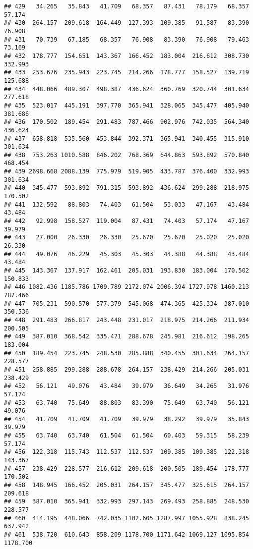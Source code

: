 \documentclass[
]{article}
\begin{document}
\begin{verbatim}
## 429   34.265   35.843   41.709   68.357   87.431   78.179   68.357   57.174
## 430  264.157  209.618  164.449  127.393  109.385   91.587   83.390   76.908
## 431   70.739   67.185   68.357   76.908   83.390   76.908   79.463   73.169
## 432  178.777  154.651  143.367  166.452  183.004  216.612  308.730  332.993
## 433  253.676  235.943  223.745  214.266  178.777  158.527  139.719  125.688
## 434  448.066  489.307  498.387  436.624  360.769  320.744  301.634  277.618
## 435  523.017  445.191  397.770  365.941  328.065  345.477  405.940  381.686
## 436  170.502  189.454  291.483  787.466  902.976  742.035  564.340  436.624
## 437  658.818  535.560  453.844  392.371  365.941  340.455  315.910  301.634
## 438  753.263 1010.588  846.202  768.369  644.863  593.892  570.840  468.454
## 439 2698.668 2088.139  775.979  519.905  433.787  376.400  332.993  301.634
## 440  345.477  593.892  791.315  593.892  436.624  299.288  218.975  170.502
## 441  132.592   88.803   74.403   61.504   53.033   47.167   43.484   43.484
## 442   92.998  158.527  119.004   87.431   74.403   57.174   47.167   39.979
## 443   27.000   26.330   26.330   25.670   25.670   25.020   25.020   26.330
## 444   49.076   46.229   45.303   45.303   44.388   44.388   43.484   43.484
## 445  143.367  137.917  162.461  205.031  193.830  183.004  170.502  150.833
## 446 1082.436 1185.786 1709.789 2172.074 2006.394 1727.978 1460.213  787.466
## 447  705.231  590.570  577.379  545.068  474.365  425.334  387.010  350.536
## 448  291.483  266.817  243.448  231.017  218.975  214.266  211.934  200.505
## 449  387.010  368.542  335.471  288.678  245.981  216.612  198.265  183.004
## 450  189.454  223.745  248.530  285.888  340.455  301.634  264.157  228.577
## 451  258.885  299.288  288.678  264.157  238.429  214.266  205.031  238.429
## 452   56.121   49.076   43.484   39.979   36.649   34.265   31.976   57.174
## 453   63.740   75.649   88.803   83.390   75.649   63.740   56.121   49.076
## 454   41.709   41.709   41.709   39.979   38.292   39.979   35.843   39.979
## 455   63.740   63.740   61.504   61.504   60.403   59.315   58.239   57.174
## 456  122.318  115.743  112.537  112.537  109.385  109.385  122.318  143.367
## 457  238.429  228.577  216.612  209.618  200.505  189.454  178.777  170.502
## 458  148.945  166.452  205.031  264.157  345.477  325.615  264.157  209.618
## 459  387.010  365.941  332.993  297.143  269.493  258.885  248.530  228.577
## 460  414.195  448.066  742.035 1102.605 1287.997 1055.928  838.245  637.942
## 461  538.720  610.643  858.209 1178.700 1171.642 1069.127 1095.854 1178.700

\end{verbatim}
\end{document}
